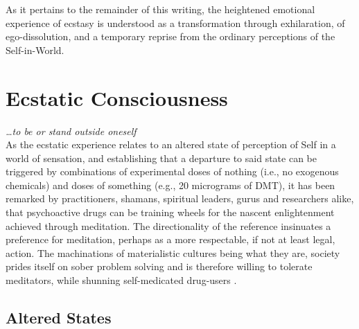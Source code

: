 \documentclass{UIdahoMastersThesis}
\begin{document}
As it pertains to the remainder of this writing, the heightened emotional experience of ecstasy is understood as a transformation through exhilaration, of ego-dissolution, and a temporary reprise from the ordinary perceptions of the Self-in-World.

\clearpage
\chapter{Ecstatic Consciousness}
\label{Chapter:EcstaticConsciousness}

\emph{\ldots to be or stand outside oneself}\\

As the ecstatic experience relates to an altered state of perception of Self in a world of sensation, and establishing that a departure to said state can be triggered by combinations of experimental doses of nothing (i.e., no exogenous chemicals) and doses of something (e.g., 20 micrograms of DMT), it has been remarked by practitioners, shamans, spiritual leaders, gurus and researchers alike, that psychoactive drugs can be training wheels for the nascent enlightenment achieved through meditation. The directionality of the reference insinuates a preference for meditation, perhaps as a more respectable, if not at least legal, action. The machinations of materialistic cultures being what they are, society prides itself on sober problem solving and is therefore willing to tolerate meditators, while shunning self-medicated drug-users \cite{noauthor_war_nodate}.

\section{Altered States}
\end{document}
